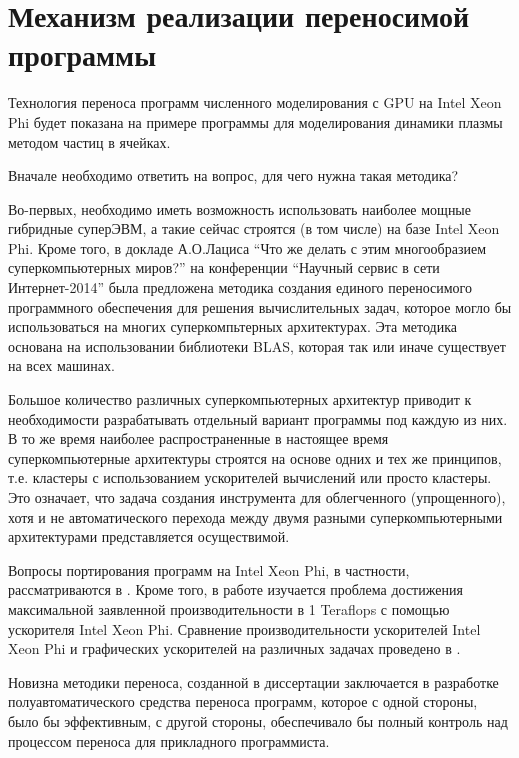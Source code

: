 \section{Механизм реализации переносимой программы}

Технология переноса программ численного моделирования с GPU на Intel Xeon Phi
будет показана на примере программы для моделирования динамики плазмы методом частиц в ячейках.

Вначале необходимо ответить на вопрос, для чего нужна такая методика?

Во-первых, необходимо иметь возможность использовать наиболее мощные гибридные суперЭВМ, а такие сейчас строятся (в том числе) на базе Intel Xeon Phi. Кроме того, в
докладе А.О.Лациса “Что же делать с этим многообразием суперкомпьютерных миров?” на конференции “Научный сервис в сети Интернет-2014” \cite{Lacis2014} была предложена методика создания единого переносимого программного обеспечения для решения вычислительных задач, которое могло бы использоваться на многих суперкомпьтерных архитектурах. Эта методика основана на использовании библиотеки BLAS, которая так или иначе существует на всех машинах.

Большое количество различных суперкомпьютерных архитектур приводит к необходимости разрабатывать отдельный вариант программы под каждую из них.
В то же время наиболее распространенные в настоящее время суперкомпьютерные архитектуры строятся на основе одних и тех же принципов, т.е. кластеры с использованием ускорителей вычислений или просто кластеры.
Это означает, что задача создания инструмента для облегченного (упрощенного), хотя и не автоматического перехода между двумя разными  суперкомпьютерными архитектурами
представляется осуществимой.

Вопросы портирования программ на Intel Xeon Phi, в частности, рассматриваются в \cite{Rosales2Phi}. Кроме того, в работе \cite{Nakashima2015} изучается проблема достижения максимальной заявленной производительности в 1 Teraflops с помощью ускорителя Intel Xeon Phi. Сравнение производительности ускорителей Intel Xeon Phi и графических ускорителей на различных задачах проведено в \cite{Lyakh201584,Liu2015230,Bernaschi20142495}.

Новизна методики переноса, созданной в диссертации заключается в разработке полуавтоматического средства переноса программ,
которое с одной стороны, было бы эффективным,
с другой стороны, обеспечивало бы полный контроль над процессом переноса для прикладного программиста.

